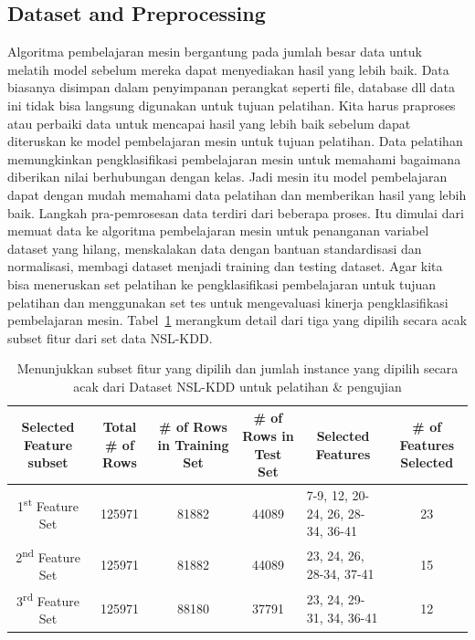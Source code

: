 \documentclass[conference]{IEEEtran}
\begin{document}
\subsection{Dataset and Preprocessing}
Algoritma pembelajaran mesin bergantung pada jumlah besar data untuk melatih model sebelum mereka dapat menyediakan hasil yang lebih baik. Data biasanya disimpan dalam penyimpanan perangkat seperti file, database dll data ini tidak bisa langsung digunakan untuk tujuan pelatihan. Kita harus praproses atau perbaiki data untuk mencapai hasil yang lebih baik sebelum dapat diteruskan ke model pembelajaran mesin untuk tujuan pelatihan. Data pelatihan memungkinkan pengklasifikasi pembelajaran mesin untuk memahami bagaimana diberikan nilai berhubungan dengan kelas. Jadi mesin itu model pembelajaran dapat dengan mudah memahami data pelatihan dan memberikan hasil yang lebih baik. Langkah pra-pemrosesan data terdiri dari beberapa proses. Itu dimulai dari memuat data ke algoritma pembelajaran mesin untuk penanganan variabel dataset yang hilang, menskalakan data dengan bantuan standardisasi dan normalisasi, membagi dataset menjadi training dan testing dataset. Agar kita bisa meneruskan set pelatihan ke pengklasifikasi pembelajaran untuk tujuan pelatihan dan menggunakan set tes untuk mengevaluasi kinerja pengklasifikasi pembelajaran mesin. Tabel~\ref{table1} merangkum detail dari tiga yang dipilih secara acak subset fitur dari set data NSL-KDD.

\begin{table}[h!]
    \centering
    \caption{Menunjukkan subset fitur yang dipilih dan jumlah instance yang dipilih secara acak dari Dataset NSL-KDD untuk pelatihan \& pengujian}

    \begin{tabular}{ p{2cm} p{2cm} p{2cm} p{2cm} p{2cm} p{2cm} }
     \hline
     \multicolumn{1}{c}{\textbf{Selected Feature subset}} & \multicolumn{1}{c}{\textbf{Total \# of Rows}} & \multicolumn{1}{c}{\textbf{\# of Rows in Training Set}} & \multicolumn{1}{c}{\textbf{\# of Rows in Test Set}} & \multicolumn{1}{c}{\textbf{Selected Features}} & \multicolumn{1}{c}{\textbf{\# of Features Selected}} \\ [0.5ex] 
     \hline\hline
     \multicolumn{1}{c}{1\textsuperscript{st} Feature Set} & \multicolumn{1}{c}{125971} & \multicolumn{1}{c}{81882} & \multicolumn{1}{c}{44089} & 7-9, 12, 20-24, 26, 28-34, 36-41 & \multicolumn{1}{c}{23}\\
     \hline
     \multicolumn{1}{c}{2\textsuperscript{nd} Feature Set} & \multicolumn{1}{c}{125971} & \multicolumn{1}{c}{81882} & \multicolumn{1}{c}{44089} & 23, 24, 26, 28-34, 37-41 & \multicolumn{1}{c}{15}\\
     \hline
     \multicolumn{1}{c}{3\textsuperscript{rd} Feature Set} & \multicolumn{1}{c}{125971} & \multicolumn{1}{c}{88180} & \multicolumn{1}{c}{37791} & 23, 24, 29-31, 34, 36-41 & \multicolumn{1}{c}{12} \\ [1ex] 
     \hline
    \end{tabular}
    \label{table1}
\end{table}
\end{document}
